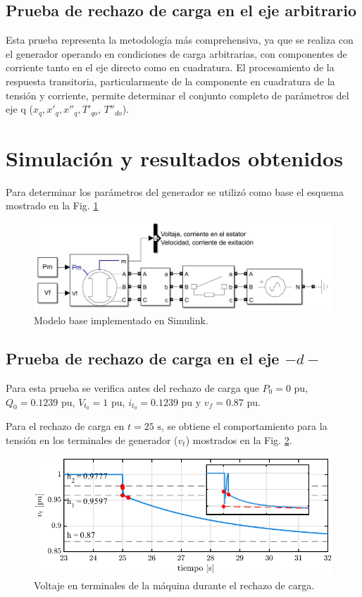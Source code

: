 \documentclass[conference]{IEEEtran}
\begin{document}
\subsection{Prueba de rechazo de carga en el eje arbitrario}

Esta prueba representa la metodología más comprehensiva, ya que se realiza con el generador operando en condiciones de carga arbitrarias, con componentes de corriente tanto en el eje directo como en cuadratura. El procesamiento de la respuesta transitoria, particularmente de la componente en cuadratura de la tensión y corriente, permite determinar el conjunto completo de parámetros del eje q ($x_q, x'_q, x''_q, T'_{qo}$, $T''_{do}$).

\section{Simulación y resultados obtenidos}
Para determinar los parámetros del generador se utilizó como base el esquema mostrado en la Fig. \ref{fig:Modelo_Simulink}

\begin{figure}[H]
    \centering
    \includegraphics[width=\linewidth]{Fig/Modelo_Simulink.pdf}
    \caption{Modelo base implementado en Simulink.}
    \label{fig:Modelo_Simulink}
\end{figure}

\subsection{Prueba de rechazo de carga en el eje $-d-$}

Para esta prueba se verifica antes del rechazo de carga que $P_0=0\text{ pu}$, $Q_0=0.1239\text{ pu}$,
$V_{t_0}=1\text{ pu}$, $i_{t_0}=0.1239\text{ pu}$ y $v_f=0.87\text{ pu}$.

Para el rechazo de carga en $t=25\text{ s}$, se obtiene el comportamiento para la tensión
en los terminales de generador ($v_t$) mostrados en la Fig. \ref{fig:fig1}.

\begin{figure}[H]
    \centering
    \includegraphics[width=\linewidth]{Fig/fig1.pdf}
    \caption{Voltaje en terminales de la máquina durante el rechazo de carga.}
    \label{fig:fig1}
\end{figure}
\end{document}
